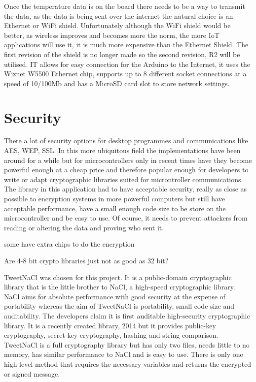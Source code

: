 Once the temperature data is on the board there needs to be a way to transmit the data, as the data is being sent over the internet the natural choice is an Ethernet or WiFi shield. Unfortunately although the WiFi shield would be better, as wireless improves and becomes more the norm, the more IoT applications will use it, it is much more expensive than the Ethernet Shield. The first revision of the shield is no longer made so the second revision, R2 will be utilised. IT allows for easy connection for the Arduino to the Internet, it uses the Wiznet W5500 Ethernet chip, supports up to 8 different socket connections at a speed of 10/100Mb and has a MicroSD card slot to store network settings. 

\section{Security}

There a lot of security options for desktop programmes and communications like AES, WEP, SSL. In this more ubiquitous field the implementations have been around for a while but for microcontrollers only in recent times have they become powerful enough at a cheap price and therefore popular enough for developers to write or adapt cryptographic libraries suited for microntroller communications. The library in this application had to have acceptable security, really as close as possible to encryption systems in more powerful computers but still have acceptable performance, have a small enough code size to be store on the microcontroller and be easy to use. Of course, it needs to prevent attackers from reading or altering the data and proving who sent it.

some have extra chips to do the encryption

Are 4-8 bit crypto libraries just not as good as 32 bit?

TweetNaCl was chosen for this project. It is a public-domain cryptographic library that is the little brother to NaCl, a high-speed cryptographic library. NaCl aims for absolute performance with good security at the expense of portability whereas the aim of TweetNaCl is portability, small code size and auditability. The developers claim it is first auditable high-security cryptographic library. It is a recently created library, 2014 but it provides public-key cryptography, secret-key cryptography, hashing and string comparison. TweetNaCl is a full cryptography library but has only two files, needs little to no memory, has similar performance to NaCl and is easy to use. There is only one high level method that requires the necessary variables and returns the encrypted or signed message.


